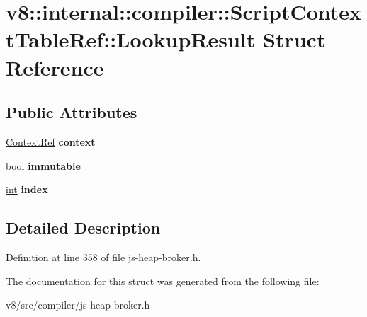 \hypertarget{structv8_1_1internal_1_1compiler_1_1ScriptContextTableRef_1_1LookupResult}{}\section{v8\+:\+:internal\+:\+:compiler\+:\+:Script\+Context\+Table\+Ref\+:\+:Lookup\+Result Struct Reference}
\label{structv8_1_1internal_1_1compiler_1_1ScriptContextTableRef_1_1LookupResult}
\subsection*{Public Attributes}
\begin{DoxyCompactItemize}
\item 
\mbox{\label{structv8_1_1internal_1_1compiler_1_1ScriptContextTableRef_1_1LookupResult_aab7d35b9fe31137726b9d45dbc60e2ca}} 
\mbox{\hyperlink{classv8_1_1internal_1_1compiler_1_1ContextRef}{Context\+Ref}} {\bfseries context}
\item 
\mbox{\label{structv8_1_1internal_1_1compiler_1_1ScriptContextTableRef_1_1LookupResult_ad5cc3ac3cff28e72a3cc6e97c7aabf22}} 
\mbox{\hyperlink{classbool}{bool}} {\bfseries immutable}
\item 
\mbox{\label{structv8_1_1internal_1_1compiler_1_1ScriptContextTableRef_1_1LookupResult_a39c9cf46513ab03c620a25c6b08bbe8e}} 
\mbox{\hyperlink{classint}{int}} {\bfseries index}
\end{DoxyCompactItemize}


\subsection{Detailed Description}


Definition at line 358 of file js-\/heap-\/broker.\+h.



The documentation for this struct was generated from the following file\+:\begin{DoxyCompactItemize}
\item 
v8/src/compiler/js-\/heap-\/broker.\+h\end{DoxyCompactItemize}
